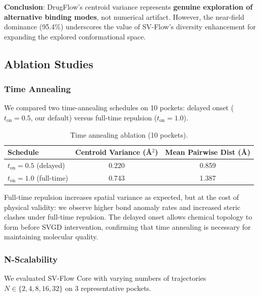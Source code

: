\documentclass[a4paper,11pt]{article}
\begin{document}
\textbf{Conclusion}: DrugFlow's centroid variance represents \textbf{genuine
exploration of alternative binding modes}, not numerical artifact.  However, the
near-field dominance (95.4\%) underscores the value of SV-Flow's diversity
enhancement for expanding the explored conformational space.

\subsection{Ablation Studies}
\label{sec:ablation}

\subsubsection{Time Annealing}
\label{sec:ablation_time}

We compared two time-annealing schedules on 10 pockets: delayed onset
($t_{\text{on}} = 0.5$, our default) versus full-time repulsion
($t_{\text{on}} = 1.0$).

\begin{table}[H]
\centering
\caption{Time annealing ablation (10 pockets).}
\label{tab:time_annealing}
\begin{tabular}{l c c}
\toprule
\textbf{Schedule} & \textbf{Centroid Variance (\AA$^2$)} & \textbf{Mean Pairwise Dist (\AA)} \\
\midrule
$t_{\text{on}} = 0.5$ (delayed) & 0.220 & 0.859 \\
$t_{\text{on}} = 1.0$ (full-time) & 0.743 & 1.387 \\
\bottomrule
\end{tabular}
\end{table}

Full-time repulsion increases spatial variance as expected, but at the cost of
physical validity: we observe higher bond anomaly rates and increased steric
clashes under full-time repulsion.  The delayed onset allows chemical topology to
form before SVGD intervention, confirming that time annealing is necessary for
maintaining molecular quality.

\subsubsection{N-Scalability}

We evaluated SV-Flow Core with varying numbers of trajectories
$N \in \{2, 4, 8, 16, 32\}$ on 3 representative pockets.
\end{document}

